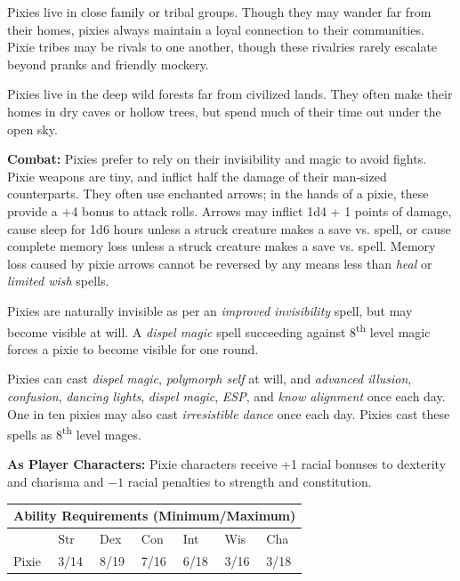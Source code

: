 \begin{multicols}{2}
Pixies live in close family or tribal groups. Though they may wander far from their homes, pixies always maintain a loyal connection to their communities. Pixie tribes may be rivals to one another, though these rivalries rarely escalate beyond pranks and friendly mockery.

Pixies live in the deep wild forests far from civilized lands. They often make their homes in dry caves or hollow trees, but spend much of their time out under the open sky.

\textbf{Combat:} Pixies prefer to rely on their invisibility and magic to avoid fights. Pixie weapons are tiny, and inflict half the damage of their man-sized counterparts. They often use enchanted arrows; in the hands of a pixie, these provide a +4 bonus to attack rolls. Arrows may inflict 1d4 + 1 points of damage, cause sleep for 1d6 hours unless a struck creature makes a save vs. spell, or cause complete memory loss unless a struck creature makes a save vs. spell. Memory loss caused by pixie arrows cannot be reversed by any means less than \textit{heal} or \textit{limited wish} spells.

Pixies are naturally invisible as per an \textit{improved invisibility} spell, but may become visible at will. A \textit{dispel magic} spell succeeding against 8\textsuperscript{th} level magic forces a pixie to become visible for one round.

Pixies can cast \textit{dispel magic}, \textit{polymorph self} at will, and \textit{advanced illusion}, \textit{confusion}, \textit{dancing lights}, \textit{dispel magic}, \textit{ESP}, and \textit{know alignment} once each day. One in ten pixies may also cast \textit{irresistible dance} once each day. Pixies cast these spells as 8\textsuperscript{th} level mages.

\textbf{As Player Characters:} Pixie characters receive +1 racial bonuses to dexterity and charisma and  $-1$ racial penalties to strength and constitution.

\noindent \begin{minipage}{\columnwidth}

\noindent \begin{tabular}{|p{}|p{}|p{}|p{}|p{}|p{}|p{}|}
\multicolumn{7}{c}{Ability Requirements (Minimum/Maximum)} \\
\hline
	& Str	& Dex	& Con	& Int	& Wis	& Cha	\\
\hline\hline
\rowcolor[gray]{.9}Pixie	& 3/14	& 8/19	& 7/16	& 6/18	& 3/16	& 3/18	\\
\hline
\end{tabular}


\end{minipage}
\end{multicols}
